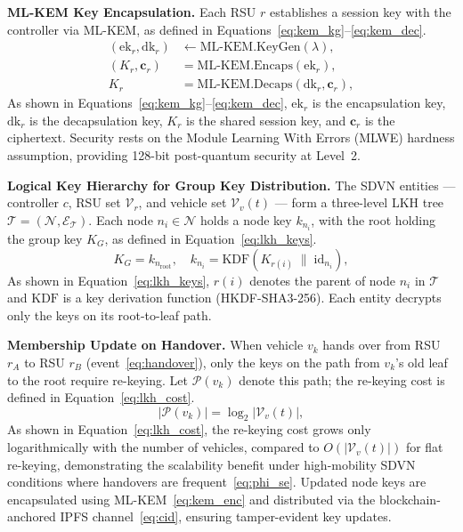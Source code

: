 \textbf{ML-KEM Key Encapsulation.}
Each RSU $r$ establishes a session key with the controller
via ML-KEM, as defined in Equations~\eqref{eq:kem_kg}--\eqref{eq:kem_dec}.
\begin{align}
(\mathrm{ek}_r, \mathrm{dk}_r)
  &\leftarrow \mathrm{ML\text{-}KEM.KeyGen}(\lambda),
  \label{eq:kem_kg} \\
(K_r, \mathbf{c}_r)
  &= \mathrm{ML\text{-}KEM.Encaps}(\mathrm{ek}_r),
  \label{eq:kem_enc} \\
K_r
  &= \mathrm{ML\text{-}KEM.Decaps}(\mathrm{dk}_r, \mathbf{c}_r),
  \label{eq:kem_dec}
\end{align}
As shown in Equations~\eqref{eq:kem_kg}--\eqref{eq:kem_dec},
$\mathrm{ek}_r$ is the encapsulation key, $\mathrm{dk}_r$
is the decapsulation key, $K_r$ is the shared session key,
and $\mathbf{c}_r$ is the ciphertext. Security rests on the
Module Learning With Errors (MLWE) hardness assumption,
providing 128-bit post-quantum security at Level~2.

\textbf{Logical Key Hierarchy for Group Key Distribution.}
The SDVN entities — controller $c$, RSU set $\mathcal{V}_r$,
and vehicle set $\mathcal{V}_v(t)$ — form a three-level LKH
tree $\mathcal{T} = (\mathcal{N}, \mathcal{E}_{\mathcal{T}})$.
Each node $n_i \in \mathcal{N}$ holds a node key $k_{n_i}$,
with the root holding the group key $K_G$, as defined in
Equation~\eqref{eq:lkh_keys}.
\begin{equation}
K_G = k_{n_{\mathrm{root}}},\quad
k_{n_i} = \mathrm{KDF}(K_{r(i)} \;\|\; \mathrm{id}_{n_i}),
\label{eq:lkh_keys}
\end{equation}
As shown in Equation~\eqref{eq:lkh_keys}, $r(i)$ denotes
the parent of node $n_i$ in $\mathcal{T}$ and $\mathrm{KDF}$
is a key derivation function (HKDF-SHA3-256). Each entity
decrypts only the keys on its root-to-leaf path.

\textbf{Membership Update on Handover.}
When vehicle $v_k$ hands over from RSU $r_A$ to RSU $r_B$
(event~\eqref{eq:handover}), only the keys on the path
from $v_k$'s old leaf to the root require re-keying.
Let $\mathcal{P}(v_k)$ denote this path; the re-keying
cost is defined in Equation~\eqref{eq:lkh_cost}.
\begin{equation}
|\mathcal{P}(v_k)| = \log_2|\mathcal{V}_v(t)|,
\label{eq:lkh_cost}
\end{equation}
As shown in Equation~\eqref{eq:lkh_cost}, the re-keying
cost grows only logarithmically with the number of vehicles,
compared to $O(|\mathcal{V}_v(t)|)$ for flat re-keying,
demonstrating the scalability benefit under high-mobility
SDVN conditions where handovers are frequent~\eqref{eq:phi_se}.
Updated node keys are encapsulated using ML-KEM~\eqref{eq:kem_enc}
and distributed via the blockchain-anchored IPFS
channel~\eqref{eq:cid}, ensuring tamper-evident key updates.

